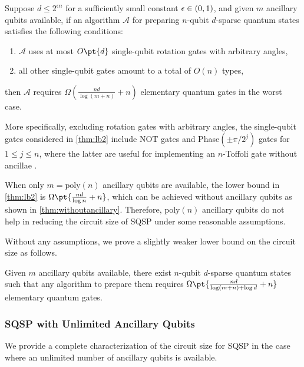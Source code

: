 \documentclass[a4paper,UKenglish,cleveref, autoref, thm-restate]{lipics-v2021}
\DeclarePairedDelimiter\rbra{\lparen}{\rparen}
\newcommand{\bo}{O\pt}
\newcommand{\om}{\Omega\pt}
\begin{document}
\begin{theorem}\label{thm:lb2}
    Suppose $d \leq 2^{\epsilon n}$ for a sufficiently small constant $\epsilon \in \rbra{0, 1}$, and given $m$ ancillary qubits available, if an algorithm $\mathcal{A}$ for preparing $n$-qubit $d$-sparse quantum states satisfies the following conditions:
    \begin{enumerate}
        \item $\mathcal{A}$ uses at most $\bo{d}$ single-qubit rotation gates with arbitrary angles,
        \item all other single-qubit gates amount to a total of $O(n)$ types,
    \end{enumerate}
 then $\mathcal{A}$ requires $\Omega(\frac{nd}{\log(m+n)} + n)$ elementary quantum gates in the worst case.
\end{theorem}

More specifically, excluding rotation gates with arbitrary angles, the single-qubit gates considered in \cref{thm:lb2} include NOT gates and Phase$(\pm \pi/2^j)$ gates for $1 \leq j \leq n$, where the latter are useful for implementing an $n$-Toffoli gate without ancillae \cite{gidney2015}.

\begin{remark}
    When only $m = \mathrm{poly}(n)$ ancillary qubits are available, the lower bound in \cref{thm:lb2} is $\om{\frac{nd}{\log n}+n}$, which can be achieved without ancillary qubits as shown in \cref{thm:withoutancillary}. Therefore, $\mathrm{poly}(n)$ ancillary qubits do not help in reducing the circuit size of SQSP under some reasonable assumptions.
\end{remark}

Without any assumptions, we prove a slightly weaker lower bound on the circuit size as follows.
\begin{theorem}\label{thm:lb1}
   Given $m$ ancillary qubits available, there exist $n$-qubit $d$-sparse quantum states such that any algorithm to prepare them requires $\om{\frac{nd}{\log(m + n) + \log d} + n}$ elementary quantum gates.
\end{theorem}

\subsubsection{SQSP with Unlimited Ancillary Qubits}
We provide a complete characterization of the circuit size for SQSP in the case where an unlimited number of ancillary qubits is available.
\end{document}
